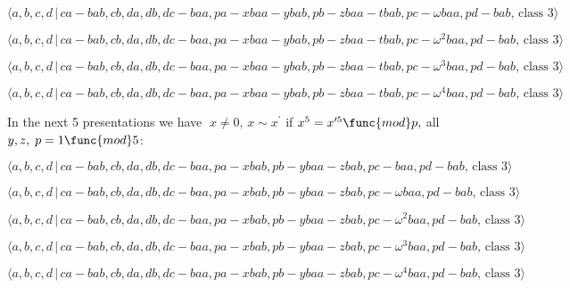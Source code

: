 \documentclass[10pt]{article}
\begin{document}
\begin{equation}
\langle
a,b,c,d\,|\,ca-bab,cb,da,db,dc-baa,pa-xbaa-ybab,pb-zbaa-tbab,pc-\omega
baa,pd-bab,\,\text{class }3\rangle  \tag{7.3577}
\end{equation}

\begin{equation}
\langle
a,b,c,d\,|\,ca-bab,cb,da,db,dc-baa,pa-xbaa-ybab,pb-zbaa-tbab,pc-\omega
^{2}baa,pd-bab,\,\text{class }3\rangle  \tag{7.3578}
\end{equation}

\begin{equation}
\langle
a,b,c,d\,|\,ca-bab,cb,da,db,dc-baa,pa-xbaa-ybab,pb-zbaa-tbab,pc-\omega
^{3}baa,pd-bab,\,\text{class }3\rangle  \tag{7.3579}
\end{equation}

\begin{equation}
\langle
a,b,c,d\,|\,ca-bab,cb,da,db,dc-baa,pa-xbaa-ybab,pb-zbaa-tbab,pc-\omega
^{4}baa,pd-bab,\,\text{class }3\rangle  \tag{7.3580}
\end{equation}

In the next 5 presentations we have $\;x\neq 0,\,x\sim x^{\prime }$ if $%
x^{5}=x^{\prime 5}\func{mod}p,$ all $y,z,\;p=1\func{mod}5$:

\begin{equation}
\langle
a,b,c,d\,|\,ca-bab,cb,da,db,dc-baa,pa-xbab,pb-ybaa-zbab,pc-baa,pd-bab,\,%
\text{class }3\rangle  \tag{7.3581}
\end{equation}

\begin{equation}
\langle a,b,c,d\,|\,ca-bab,cb,da,db,dc-baa,pa-xbab,pb-ybaa-zbab,pc-\omega
baa,pd-bab,\,\text{class }3\rangle  \tag{7.3582}
\end{equation}

\begin{equation}
\langle a,b,c,d\,|\,ca-bab,cb,da,db,dc-baa,pa-xbab,pb-ybaa-zbab,pc-\omega
^{2}baa,pd-bab,\,\text{class }3\rangle  \tag{7.3583}
\end{equation}

\begin{equation}
\langle a,b,c,d\,|\,ca-bab,cb,da,db,dc-baa,pa-xbab,pb-ybaa-zbab,pc-\omega
^{3}baa,pd-bab,\,\text{class }3\rangle  \tag{7.3584}
\end{equation}

\begin{equation}
\langle a,b,c,d\,|\,ca-bab,cb,da,db,dc-baa,pa-xbab,pb-ybaa-zbab,pc-\omega
^{4}baa,pd-bab,\,\text{class }3\rangle  \tag{7.3585}
\end{equation}
\end{document}
